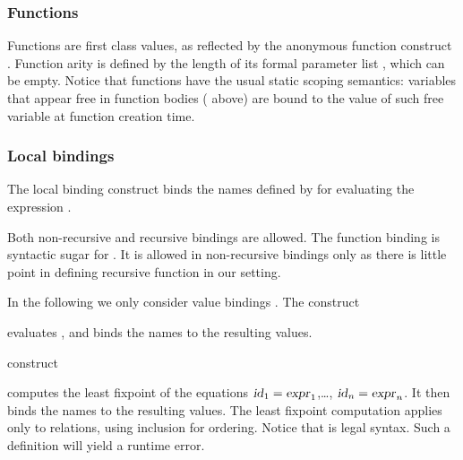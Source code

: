 \subsubsection*{Functions}
Functions are first class values, as reflected by the anonymous
function construct .
Function arity is defined by the length of its formal parameter list
, which can be empty.
Notice that functions have the usual static scoping semantics:
variables that appear free in function bodies 
( above) are bound to
the value of such free variable at function creation time.


\subsubsection*{\label{bindings}Local bindings}
The local binding construct
binds the names defined by  
for evaluating the expression .

Both non-recursive and recursive bindings are allowed.
The function binding
 is syntactic sugar
for .
It is allowed in non-recursive bindings only as there is little point
in defining recursive function in our setting.

In the following we only consider value bindings .
The construct
\begin{center}
  
\end{center}
evaluates ,
and binds the names   to the resulting values.

 construct
\begin{center}
  
\end{center}
computes the least fixpoint of the equations
$\hbox{\sl id\/}_1 = \hbox{\sl expr\/}_1$,\ldots, $\hbox{\sl id\/}_n = \hbox{\sl expr\/}_n$.
It then binds the names  to the
resulting values.
The least fixpoint computation applies only to relations, using
inclusion for ordering.
Notice that
 is legal syntax. Such a definition will yield
a runtime error.

